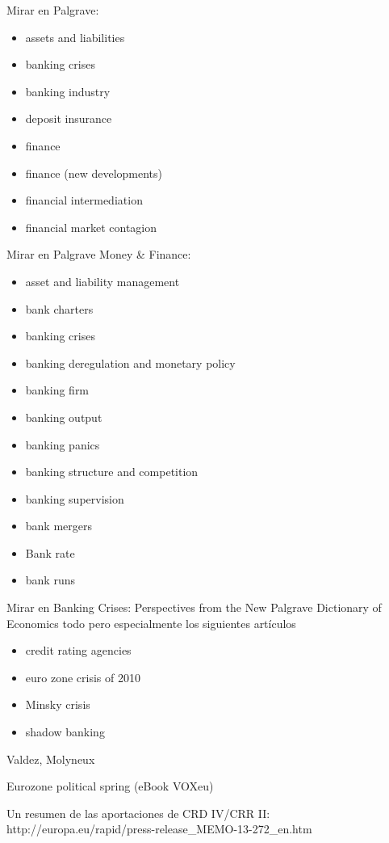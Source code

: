 \documentclass{nuevotema}
\begin{document}
\bibliografia

Mirar en Palgrave:

\begin{itemize}
	\item assets and liabilities
	\item banking crises
	\item banking industry
	\item deposit insurance
	\item finance
	\item finance (new developments)
	\item financial intermediation
	\item financial market contagion
\end{itemize}

Mirar en Palgrave Money \& Finance:

\begin{itemize}
	\item asset and liability management
	\item bank charters
	\item banking crises
	\item banking deregulation and monetary policy
	\item banking firm
	\item banking output
	\item banking panics
	\item banking structure and competition
	\item banking supervision
	\item bank mergers
	\item Bank rate
	\item bank runs
\end{itemize}

Mirar en Banking Crises: Perspectives from the New Palgrave Dictionary of Economics todo pero especialmente los siguientes artículos
\begin{itemize}
	\item credit rating agencies
	\item euro zone crisis of 2010
	\item Minsky crisis
	\item shadow banking
\end{itemize}

Valdez, Molyneux

Eurozone political spring (eBook VOXeu)

Un resumen de las aportaciones de CRD IV/CRR II: http://europa.eu/rapid/press-release\_MEMO-13-272\_en.htm
\end{document}

